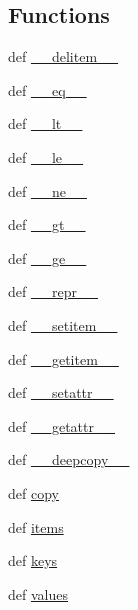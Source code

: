 \subsection*{Functions}
\begin{CompactItemize}
\item 
def \hyperlink{namespacePyPedal_1_1odict_66328bfb7a954184d75037369e8d095b}{\_\-\_\-delitem\_\-\_\-}
\item 
def \hyperlink{namespacePyPedal_1_1odict_6623f0dfd4da79422bcbdcd534133cf6}{\_\-\_\-eq\_\-\_\-}
\item 
def \hyperlink{namespacePyPedal_1_1odict_6d3f68fb4b339d6999c8de0b683ac30c}{\_\-\_\-lt\_\-\_\-}
\item 
def \hyperlink{namespacePyPedal_1_1odict_07dd9f13756f6c1c4a09757539a7d823}{\_\-\_\-le\_\-\_\-}
\item 
def \hyperlink{namespacePyPedal_1_1odict_4a516999d2abed037fdb7842f93b003b}{\_\-\_\-ne\_\-\_\-}
\item 
def \hyperlink{namespacePyPedal_1_1odict_5fd1396966178d5edfb09a4aca844511}{\_\-\_\-gt\_\-\_\-}
\item 
def \hyperlink{namespacePyPedal_1_1odict_01a601bc99a7b43670f72ce56f8cfb52}{\_\-\_\-ge\_\-\_\-}
\item 
def \hyperlink{namespacePyPedal_1_1odict_dfe57eeb9c9a285323fbe7ee52c7e114}{\_\-\_\-repr\_\-\_\-}
\item 
def \hyperlink{namespacePyPedal_1_1odict_a5e4184ecd50c5c8272865538da01318}{\_\-\_\-setitem\_\-\_\-}
\item 
def \hyperlink{namespacePyPedal_1_1odict_eeb1e091b0c6cb93f4de06806a88a744}{\_\-\_\-getitem\_\-\_\-}
\item 
def \hyperlink{namespacePyPedal_1_1odict_596cea3c32886770dfcdf57d64db09fa}{\_\-\_\-setattr\_\-\_\-}
\item 
def \hyperlink{namespacePyPedal_1_1odict_f845d0373d3d7f018d050aa8afa76d2d}{\_\-\_\-getattr\_\-\_\-}
\item 
def \hyperlink{namespacePyPedal_1_1odict_1cf35b25845fce82854cd61489fa9111}{\_\-\_\-deepcopy\_\-\_\-}
\item 
def \hyperlink{namespacePyPedal_1_1odict_afd7852dbac962331ecc87f431e25d64}{copy}
\item 
def \hyperlink{namespacePyPedal_1_1odict_157cd44354275c74279e628f938c41d8}{items}
\item 
def \hyperlink{namespacePyPedal_1_1odict_b5027844a4b052a1d2ee5139786d6e8c}{keys}
\item 
def \hyperlink{namespacePyPedal_1_1odict_87c8f6a804b58bc4dff15b55fe1fa4b4}{values}

\end{CompactItemize}
